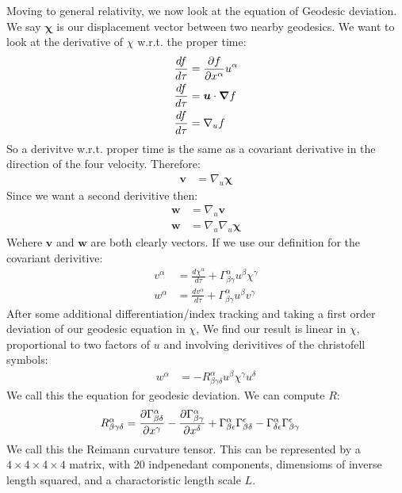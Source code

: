 Moving to general relativity, we now look at the equation of Geodesic deviation.
We say $\bm{\chi}$ is our displacement vector between two nearby geodesics.
We want to look at the derivative of $\chi$ w.r.t. the proper time:
\begin{align*}
	\frac{df}{d\tau} &= \frac{\partial f}{\partial x^\alpha} u^\alpha \\
	\frac{df}{d\tau} &= \bm{u}\cdot\bm{\nabla} f \\
	\frac{df}{d\tau} &= \nabla_u f
\end{align*}
So a derivitve w.r.t. proper time is the same as a covariant derivative in the direction of the four velocity. Therefore:
\begin{align*}
	\bm{v} &= \nabla_u \bm{\chi}
\end{align*}
Since we want a second derivitive then:
\begin{align*}
	\bm{w} &= \nabla_u \bm{v} \\
	\bm{w} &= \nabla_u\nabla_u \bm{\chi}
\end{align*}
Wehere $\bm{v}$ and $\bm{w}$ are both clearly vectors. If we use our definition for the covariant derivitive:
\begin{align*}
	v^\alpha &= \frac{d\chi^\alpha}{d\tau} + \Gamma^\alpha_{\beta\gamma} u^\beta \chi^\gamma \\
	w^\alpha &= \frac{dv^\alpha}{d\tau} + \Gamma^\alpha_{\beta\gamma} u^\beta v^\gamma
\end{align*}
After some additional differentiation/index tracking and taking a first order deviation of our geodesic equation in $\chi$, We find our result is linear in $\chi$, proportional to two factors of $u$ and involving derivitives of the christofell symbols:
\begin{align*}
	w^\alpha &= - R^\alpha_{\beta\gamma\delta} u^\beta\chi^\gamma u^\delta
\end{align*}
We call this the equation for geodesic deviation. We can compute $R$:
\begin{align*}
	R^\alpha_{\beta\gamma\delta} &= \frac{\partial \Gamma^\alpha_{\beta\delta}}{\partial x^\gamma} - \frac{\partial \Gamma^\alpha_{\beta\gamma}}{\partial x^\delta} + \Gamma^\alpha_{\beta\epsilon}\Gamma^\epsilon_{\beta\delta} - \Gamma^\alpha_{\delta\epsilon}\Gamma^\epsilon_{\beta\gamma}
\end{align*}
We call this the Reimann curvature tensor. This can be represented by a $4\times4\times4\times4$ matrix, with 20 indpenedant components, dimensioms of inverse length squared, and a charactoristic length scale $L$.

